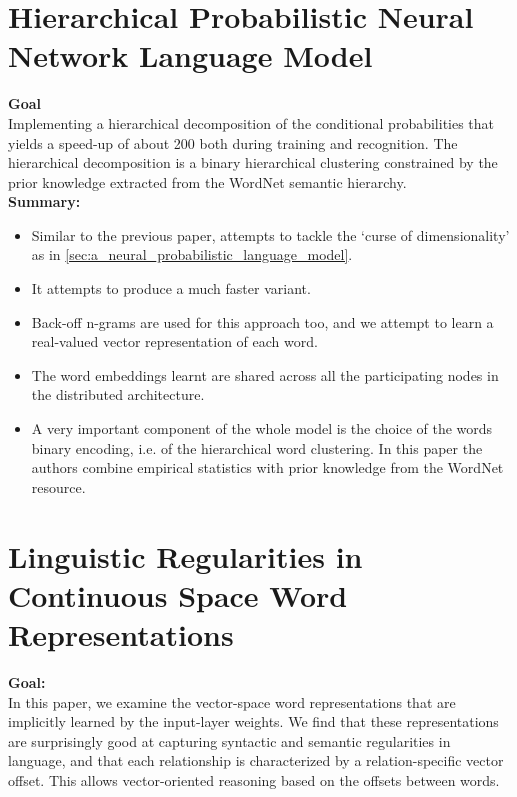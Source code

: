 \documentclass[11pt,a4paper]{article}
\begin{document}


\section{Hierarchical Probabilistic Neural Network Language Model} %
\label{sec:hierarchical_probabilistic_neural_network_language_model}

  \textbf{Goal}\\
  Implementing a  hierarchical decomposition of the conditional probabilities that yields a speed-up of about 200 both during training and recognition. The hierarchical decomposition is a binary hierarchical clustering constrained by the prior knowledge extracted from the WordNet semantic hierarchy.\\

  \textbf{Summary:}
  \begin{itemize}
    \item 
    Similar to the previous paper, attempts to tackle the `curse of dimensionality' as in \ref{sec:a_neural_probabilistic_language_model}. 
    \item 
    It attempts to produce a much faster variant.
    \item 
    Back-off n-grams are used for this approach too, and we attempt to learn a real-valued vector representation of each word.
    \item 
    The word embeddings learnt are shared across all the participating nodes in the distributed architecture.
    \item 
    A very important component of the whole model is the choice of the words binary encoding, i.e. of the hierarchical word clustering. In this paper the authors combine empirical statistics with prior knowledge from the WordNet resource.
  \end{itemize}



\section{Linguistic Regularities in Continuous Space Word Representations} %
\label{sec:linguistic_regularities_in_continuous_space_word_representations}


  \textbf{Goal:}\\
  In this paper, we examine the vector-space word representations that are implicitly learned by the input-layer weights. We find that these representations are surprisingly good at capturing syntactic and semantic regularities in language, and that each relationship is characterized by a relation-specific vector offset. This allows vector-oriented reasoning based on the offsets between words. \cite{mikolov2013linguistic} \\
\end{document}
